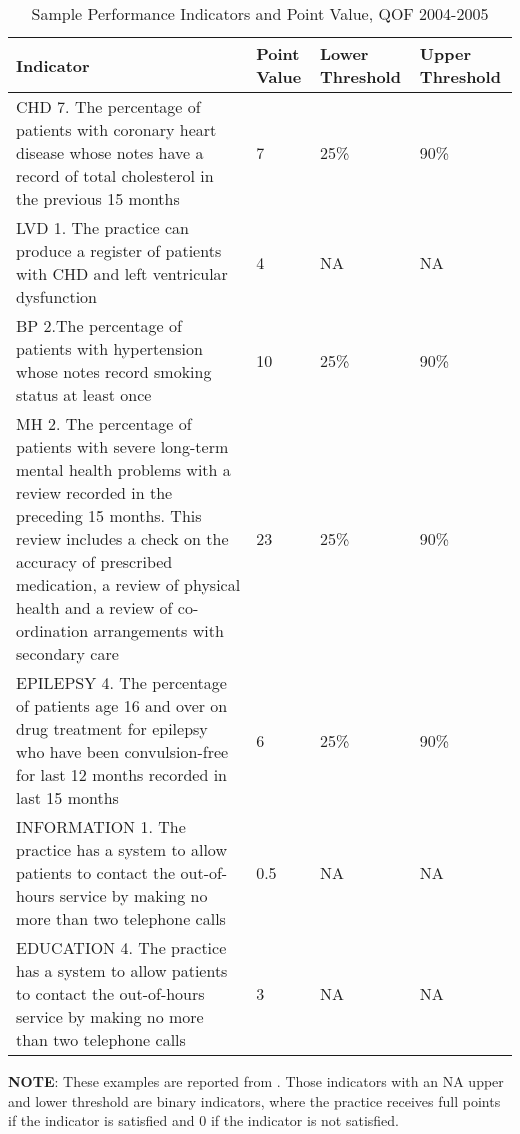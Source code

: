 \documentclass[12pt]{article}
\begin{document}
\begin{table}
  \caption{Sample Performance Indicators and Point Value, QOF 2004-2005}
  \begin{center}
      \begin{threeparttable}
      \begin{tabularx}{\textwidth}{|p{8cm}|Y|Y|Y|}
        \hline
        \textbf{Indicator} & \textbf{Point Value} & \textbf{Lower Threshold} & \textbf{Upper Threshold} \\
        \hline
        CHD 7. The percentage of patients with coronary heart disease whose notes have a record of total cholesterol in the previous 15 months & 7 & 25\% & 90\% \\
        \hline
        LVD 1. The practice can produce a register of patients with CHD and left ventricular dysfunction & 4 & NA & NA \\
        \hline
        BP 2.The percentage of patients with hypertension whose notes record smoking status at least once & 10 & 25\% & 90\% \\
        \hline
        MH 2. The percentage of patients with severe long-term mental health problems with a review recorded in the preceding 15 months. This review includes a check on the accuracy of prescribed medication, a review of physical health and a review of co-ordination arrangements with secondary care & 23 & 25\% & 90\% \\
        \hline
        EPILEPSY 4. The percentage of patients age 16 and over on drug treatment for epilepsy who have been convulsion-free for last 12 months recorded in last 15 months & 6 & 25\% & 90\% \\
        \hline
        INFORMATION 1. The practice has a system to allow patients to contact the out-of-hours service by making no more than two telephone calls & 0.5 & NA & NA \\
        \hline
        EDUCATION 4. The practice has a system to allow patients to contact the out-of-hours service by making no more than two telephone calls & 3 & NA & NA \\
        \hline
      \end{tabularx}
      \begin{tablenotes}
        \footnotesize
        \textbf{NOTE}: These examples are reported from \citet{nationalhealthserviceNationalQualityOutcomes2005}. Those indicators with an NA upper and lower threshold are binary indicators, where the practice receives full points if the indicator is satisfied and 0 if the indicator is not satisfied.
      \end{tablenotes}
    \end{threeparttable}
  \end{center}
\label{2004QOFIndicatorsExamples}
\end{table}
\end{document}
